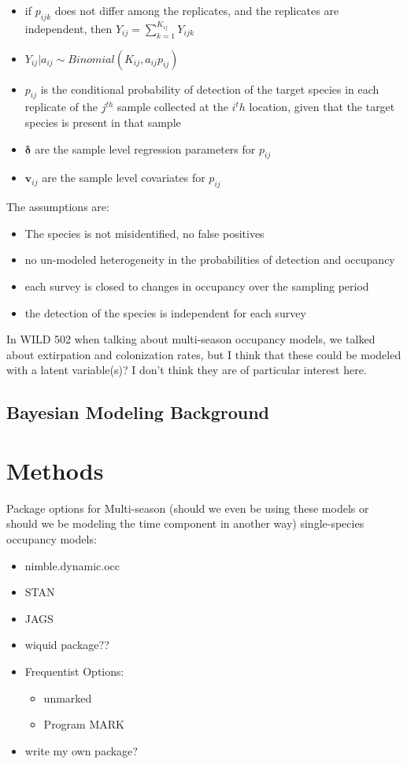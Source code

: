\documentclass[12pt]{article}\usepackage[]{graphicx}\usepackage[]{color}
\begin{document}
\begin{itemize}
\item if $p_{ijk}$ does not differ among the replicates, and the replicates are independent, then $Y_{ij} = \sum_{k = 1}^{K_{ij}}Y_{ijk}$
\item $Y_{ij}|a_{ij} \sim Binomial(K_{ij}, a_{ij}p_{ij})$
\item $p_{ij}$ is the conditional probability of detection of the target species in each replicate of the $j^{th}$ sample collected at the $i^th$ location, given that the target species is present in that sample
\item $\bm{\delta}$ are the sample level regression parameters for $p_{ij}$ 
\item $\bm{v}_{ij}$ are the sample level covariates for $p_{ij}$
\end{itemize}


The assumptions are: 
\begin{itemize}
\item The species is not misidentified, no false positives
\item no un-modeled heterogeneity in the probabilities of detection and occupancy
\item each survey is closed to changes in occupancy over the sampling period
\item the detection of the species is independent for each survey
\end{itemize}


In WILD 502 when talking about multi-season occupancy models, we talked about extirpation and colonization rates, but I think that these could be modeled with a latent variable(s)? I don't think they are of particular interest here. 






 
\subsection{Bayesian Modeling Background}

\section{Methods}

Package options for Multi-season (should we even be using these models or should we be modeling the time component in another way) single-species occupancy models: 
\begin{itemize}
\item nimble.dynamic.occ
\item STAN
\item JAGS
\item wiquid package??
\item Frequentist Options: 
  \begin{itemize}
  \item unmarked
  \item Program MARK
  \end{itemize}
\item write my own package? 
\end{itemize}
\end{document}
